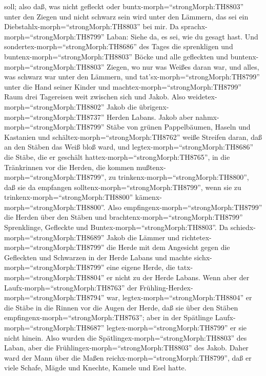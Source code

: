 soll; also daß, was nicht gefleckt oder
buntx-morph=``strongMorph:TH8803'' unter den Ziegen und nicht schwarz
sein wird unter den Lämmern, das sei ein
Diebstahlx-morph=``strongMorph:TH8803'' bei mir.  Da
sprachx-morph=``strongMorph:TH8799'' Laban: Siehe da, es sei, wie du
gesagt hast.  Und sondertex-morph=``strongMorph:TH8686''
des Tages die sprenkligen und buntenx-morph=``strongMorph:TH8803'' Böcke
und alle gefleckten und buntenx-morph=``strongMorph:TH8803'' Ziegen, wo
nur was Weißes daran war, und alles, was schwarz war unter den Lämmern,
und tat'sx-morph=``strongMorph:TH8799'' unter die Hand seiner Kinder
 und machtex-morph=``strongMorph:TH8799'' Raum drei
Tagereisen weit zwischen sich und Jakob. Also
weidetex-morph=``strongMorph:TH8802'' Jakob die
übrigenx-morph=``strongMorph:TH8737'' Herden Labans.  Jakob
aber nahmx-morph=``strongMorph:TH8799'' Stäbe von grünen Pappelbäumen,
Haseln und Kastanien und schältex-morph=``strongMorph:TH8762'' weiße
Streifen daran, daß an den Stäben das Weiß bloß ward,  und
legtex-morph=``strongMorph:TH8686'' die Stäbe, die er geschält
hattex-morph=``strongMorph:TH8765'', in die Tränkrinnen vor die Herden,
die kommen mußtenx-morph=``strongMorph:TH8799'', zu
trinkenx-morph=``strongMorph:TH8800'', daß sie da empfangen
solltenx-morph=``strongMorph:TH8799'', wenn sie zu
trinkenx-morph=``strongMorph:TH8800''
kämenx-morph=``strongMorph:TH8800''.  Also
empfingenx-morph=``strongMorph:TH8799'' die Herden über den Stäben und
brachtenx-morph=``strongMorph:TH8799'' Sprenklinge, Gefleckte und
Buntex-morph=``strongMorph:TH8803''.  Da
schiedx-morph=``strongMorph:TH8689'' Jakob die Lämmer und
richtetex-morph=``strongMorph:TH8799'' die Herde mit dem Angesicht gegen
die Gefleckten und Schwarzen in der Herde Labans und machte
sichx-morph=``strongMorph:TH8799'' eine eigene Herde, die
tatx-morph=``strongMorph:TH8804'' er nicht zu der Herde Labans.
 Wenn aber der Laufx-morph=``strongMorph:TH8763'' der
Frühling-Herdex-morph=``strongMorph:TH8794'' war,
legtex-morph=``strongMorph:TH8804'' er die Stäbe in die Rinnen vor die
Augen der Herde, daß sie über den Stäben
empfingenx-morph=``strongMorph:TH8763'';  aber in der
Spätlinge Laufx-morph=``strongMorph:TH8687''
legtex-morph=``strongMorph:TH8799'' er sie nicht hinein. Also wurden die
Spätlingex-morph=``strongMorph:TH8803'' des Laban, aber die
Frühlingex-morph=``strongMorph:TH8803'' des Jakob.  Daher
ward der Mann über die Maßen reichx-morph=``strongMorph:TH8799'', daß er
viele Schafe, Mägde und Knechte, Kamele und Esel hatte.

